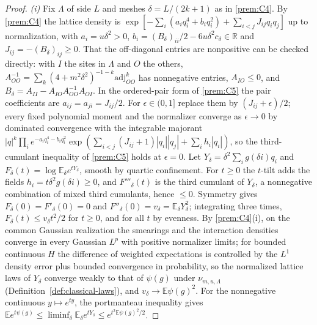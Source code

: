 \documentclass[11pt]{article}
\theoremstyle{plain}
\theoremstyle{definition}
\theoremstyle{remark}
\newcommand{\R}{\mathbb{R}}
\newcommand{\E}{\mathbb{E}}
\begin{document}
\begin{proof}
\emph{(i)} Fix $\Lambda$ of side $L$ and meshes $\delta=L/(2k+1)$ as in \ref{prem:C4}. By
\ref{prem:C4} the lattice density is
$\exp[-\sum_i(a_iq_i^{4}+b_iq_i^{2})+\sum_{i<j}J_{ij}q_iq_j]$ up to normalization, with
$a_i=u\delta^{2}>0$, $b_i=(B_\delta)_{ii}/2-6u\delta^{2}c_\delta\in\R$ and $J_{ij}=-(B_\delta)_{ij}\ge0$. That the
off-diagonal entries are nonpositive can be checked directly: with $I$ the sites
in $\Lambda$ and $O$ the others, $A_{OO}^{-1}=\sum_k(4+m^{2}\delta^{2})^{-1-k}\mathrm{adj}_{OO}^{k}$ has
nonnegative entries, $A_{IO}\le0$, and $B_\delta=A_{II}-A_{IO}A_{OO}^{-1}A_{OI}$. In the
ordered-pair form of \ref{prem:C5} the pair coefficients are $a_{ij}=a_{ji}=J_{ij}/2$.
For $\epsilon\in(0,1]$ replace them by $(J_{ij}+\epsilon)/2$; every fixed polynomial moment
and the normalizer converge as $\epsilon\to0$ by dominated convergence with the
integrable majorant
$|q|^{k}\prod_ie^{-a_iq_i^{4}-b_iq_i^{2}}\exp(\sum_{i<j}(J_{ij}+1)|q_i||q_j|+\sum_ih_i|q_i|)$, so
the third-cumulant inequality of \ref{prem:C5} holds at $\epsilon=0$. Let
$Y_\delta=\delta^{2}\sum_ig(\delta i)q_i$ and $F_\delta(t)=\log\E_\delta e^{tY_\delta}$, smooth by quartic
confinement. For $t\ge0$ the $t$-tilt adds the fields $h_i=t\delta^{2}g(\delta i)\ge0$, and
$F'''_\delta(t)$ is the third cumulant of $Y_\delta$, a nonnegative combination of mixed
third cumulants, hence $\le0$. Symmetry gives $F_\delta(0)=F'_\delta(0)=0$ and
$F''_\delta(0)=v_\delta=\E_\delta Y_\delta^{2}$; integrating three times,
$F_\delta(t)\le v_\delta t^{2}/2$ for $t\ge0$, and for all $t$ by evenness. By
\ref{prem:C4}(i), on the common Gaussian realization the smearings and the
interaction densities converge in every Gaussian $L^{p}$ with positive normalizer
limits; for bounded continuous $H$ the difference of weighted expectations is
controlled by the $L^{1}$ density error plus bounded convergence in probability,
so the normalized lattice laws of $Y_\delta$ converge weakly to that of $\psi(g)$ under
$\nu_{m,u,\Lambda}$ (Definition~\ref{def:classical-laws}), and $v_\delta\to\E\psi(g)^{2}$. For the
nonnegative continuous $y\mapsto e^{ty}$, the portmanteau inequality gives
$\E e^{t\psi(g)}\le\liminf_\delta\E_\delta e^{tY_\delta}\le e^{t^{2}\E\psi(g)^{2}/2}$.


\end{proof}
\end{document}
